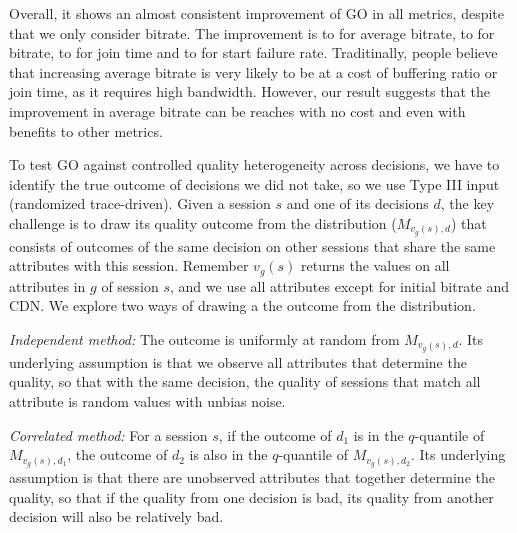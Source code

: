 Overall, it shows an almost consistent improvement of GO in all metrics, despite that we only consider bitrate. The improvement is \fillme to \fillme for average bitrate, \fillme to \fillme for bitrate, \fillme to \fillme for join time and \fillme to \fillme for start failure rate. Traditinally, people believe that increasing average bitrate is very likely to be at a cost of buffering ratio or join time, as it requires high bandwidth. However, our result suggests that the improvement in average bitrate can be reaches with no cost and even with benefits to other metrics.


To test GO against controlled quality heterogeneity across decisions, we have to identify the true outcome of decisions we did not take, so we use Type III input (randomized trace-driven). Given a session $s$ and one of its decisions $d$, the key challenge is to draw its quality outcome from the distribution ($M_{v_g(s),d}$) that consists of outcomes of the same decision on other sessions that share the same attributes with this session. Remember $v_g(s)$ returns the values on all attributes in $g$ of session $s$, and we use all attributes except for initial bitrate and CDN.
We explore two ways of drawing a the outcome from the distribution. 
\begin{packedenumerate}
	\item {\it Independent method:} The outcome is uniformly at random from $M_{v_g(s),d}$. Its underlying assumption is that we observe all attributes that determine the quality, so that with the same decision, the quality of sessions that match all attribute is random values with unbias noise.
	\item {\it Correlated method:} For a session $s$, if the outcome of $d_1$ is in the $q$-quantile of $M_{v_g(s),d_1}$, the outcome of $d_2$ is also in the $q$-quantile of $M_{v_g(s),d_2}$. Its underlying assumption is that there are unobserved attributes that together determine the quality, so that if the quality from one decision is bad, its quality from another decision will also be relatively bad.
\end{packedenumerate}

